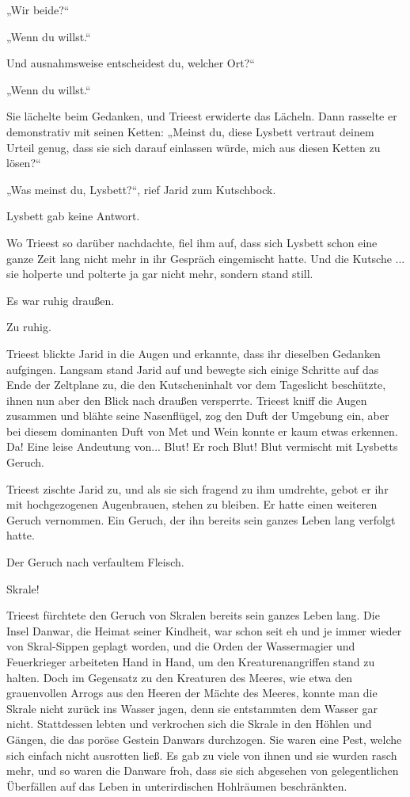 „Wir beide?“

„Wenn du willst.“

Und ausnahmsweise entscheidest du, welcher Ort?“

„Wenn du willst.“

Sie lächelte beim Gedanken, und Trieest erwiderte das Lächeln. Dann rasselte er demonstrativ mit seinen Ketten: „Meinst du, diese Lysbett vertraut deinem Urteil genug, dass sie sich darauf einlassen würde, mich aus diesen Ketten zu lösen?“

„Was meinst du, Lysbett?“, rief Jarid zum Kutschbock.

Lysbett gab keine Antwort.

Wo Trieest so darüber nachdachte, fiel ihm auf, dass sich Lysbett schon eine ganze Zeit lang nicht mehr in ihr Gespräch eingemischt hatte. Und die Kutsche ... sie holperte und polterte ja gar nicht mehr, sondern stand still.

Es war ruhig draußen.

Zu ruhig.

Trieest blickte Jarid in die Augen und erkannte, dass ihr dieselben Gedanken aufgingen. Langsam stand Jarid auf und bewegte sich einige Schritte auf das Ende der Zeltplane zu, die den Kutscheninhalt vor dem Tageslicht beschützte, ihnen nun aber den Blick nach draußen versperrte. Trieest kniff die Augen zusammen und blähte seine Nasenflügel, zog den Duft der Umgebung ein, aber bei diesem dominanten Duft von Met und Wein konnte er kaum etwas erkennen. Da! Eine leise Andeutung von... Blut! Er roch Blut! Blut vermischt mit Lysbetts Geruch.

Trieest zischte Jarid zu, und als sie sich fragend zu ihm umdrehte, gebot er ihr mit hochgezogenen Augenbrauen, stehen zu bleiben. Er hatte einen weiteren Geruch vernommen. Ein Geruch, der ihn bereits sein ganzes Leben lang verfolgt hatte.

Der Geruch nach verfaultem Fleisch.

Skrale!\bigskip







Trieest fürchtete den Geruch von Skralen bereits sein ganzes Leben lang. Die Insel Danwar, die Heimat seiner Kindheit, war schon seit eh und je immer wieder von Skral-Sippen geplagt worden, und die Orden der Wassermagier und Feuerkrieger arbeiteten Hand in Hand, um den Kreaturenangriffen stand zu halten. Doch im Gegensatz zu den Kreaturen des Meeres, wie etwa den grauenvollen Arrogs aus den Heeren der Mächte des Meeres, konnte man die Skrale nicht zurück ins Wasser jagen, denn sie entstammten dem Wasser gar nicht. Stattdessen lebten und verkrochen sich die Skrale in den Höhlen und Gängen, die das poröse Gestein Danwars durchzogen. Sie waren eine Pest, welche sich einfach nicht ausrotten ließ. Es gab zu viele von ihnen und sie wurden rasch mehr, und so waren die Danware froh, dass sie sich abgesehen von gelegentlichen Überfällen auf das Leben in unterirdischen Hohlräumen beschränkten.

